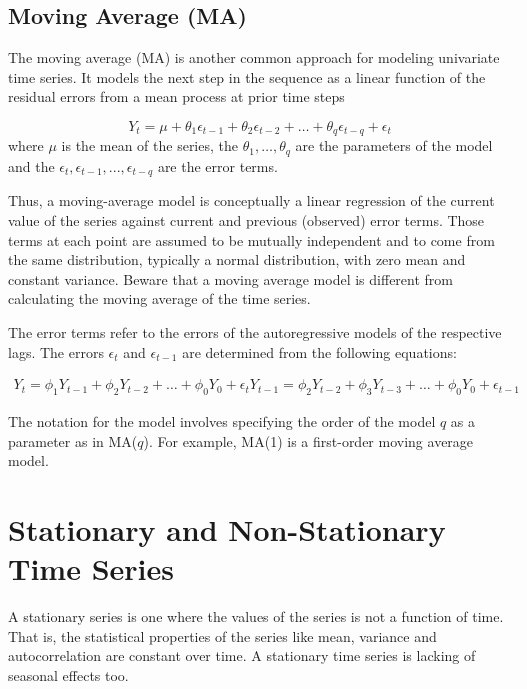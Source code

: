 \subsection{Moving Average (MA)}\label{moving-average-ma}

The moving average (MA) is another common approach for modeling
univariate time series. It models the next step in the sequence as a
linear function of the residual errors from a mean process at prior time
steps

\begin{equation}
Y_t = \mu + \theta_1 \epsilon_{t-1} + \theta_2 \epsilon_{t-2} + \ldots + \theta_q \epsilon_{t-q} + \epsilon_t
\end{equation}
where \(\mu\) is the mean of the series, the
\(\theta_1, \ldots, \theta_q\) are the parameters of the model and the
\(\epsilon_t, \epsilon_{t−1},..., \epsilon_{t−q}\) are the error terms.

Thus, a moving-average model is conceptually a linear regression of the
current value of the series against current and previous (observed)
error terms. Those terms at each point are assumed to be mutually
independent and to come from the same distribution, typically a normal
distribution, with zero mean and constant variance.
Beware that a moving average model is different from calculating
the moving average of the time series.

The error terms refer to the errors of the autoregressive models of
the respective lags. The errors \(\epsilon_t\) and \(\epsilon_{t-1}\) are
determined from the following equations:

\begin{equation}
\begin{gathered}
Y_t = \phi_1 Y_{t-1} + \phi_2 Y_{t-2} + \ldots + \phi_0 Y_{0} + \epsilon_t
Y_{t-1} = \phi_2 Y_{t-2} + \phi_3 Y_{t-3} + \ldots + \phi_0 Y_{0} + \epsilon_{t-1}
\end{gathered}
\end{equation}

The notation for the model involves specifying the order of the model $q$
as a parameter as in MA($q$). For example, MA(1) is a
first-order moving average model.

\section{Stationary and Non-Stationary Time Series}
\label{stationary-and-non-stationary-time-series}

A stationary series is one where the values of the series is not a
function of time. That is, the statistical properties of the series like
mean, variance and autocorrelation are constant over time. A stationary
time series is lacking of seasonal effects too.

